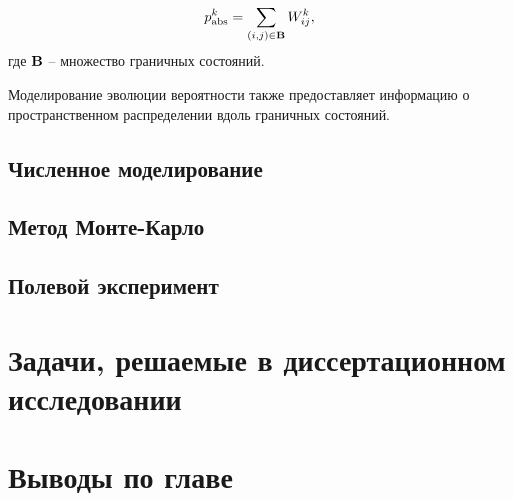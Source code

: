 \begin{equation}
    \begin{aligned}
    p_{\rm abs}^{k}=\sum_{(i, j) \in {\bf B}} W_{ij}^{k},
    \label{eq:timedistr}
    \end{aligned}
\end{equation}
где ${\bf B}$ -- множество граничных состояний.

Моделирование эволюции вероятности также предоставляет информацию о пространственном распределении вдоль граничных состояний.





\subsection{Численное моделирование}\label{subsec:ch1/sec3/sub4}
\subsection{Метод Монте-Карло}\label{subsec:ch1/sec3/sub5}
\subsection{Полевой эксперимент}\label{subsec:ch1/sec3/sub6}

\section{Задачи, решаемые в диссертационном исследовании}\label{sec:ch1/sec4}

\section{Выводы по главе}\label{sec:ch1/sec5}











